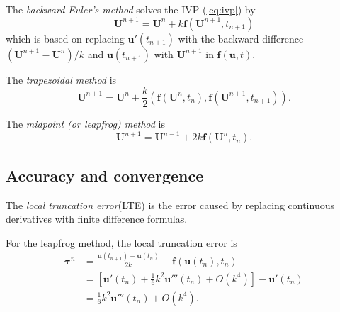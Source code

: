 \begin{defn}
 The \emph{backward Euler's method} solves the IVP (\ref{eq:ivp})
  by
  \begin{equation}
    \mathbf{U}^{n+1} = \mathbf{U}^n+k\mathbf{f}(\mathbf{U}^{n+1},t_{n+1})
  \end{equation}
  which is based on replacing $\mathbf{u}'(t_{n+1})$ with the backward
  difference $(\mathbf{U}^{n+1}-\mathbf{U}^n)/k$ and
  $\mathbf{u}(t_{n+1})$
  with $\mathbf{U}^{n+1}$ in $\mathbf{f}(\mathbf{u},t)$.
\end{defn}

\begin{defn}
  The \emph{trapezoidal method} is
  \begin{equation}
    \label{eq:trapezoidal}
    \mathbf{U}^{n+1}=\mathbf{U}^n+\frac{k}{2}(\mathbf{f}(\mathbf{U}^{n},t_n),\mathbf{f}(\mathbf{U}^{n+1},t_{n+1})).
  \end{equation}
\end{defn}

\begin{defn}
  The \emph{midpoint (or leapfrog) method} is
  \begin{equation}
    \label{eq:midpoint}
    \mathbf{U}^{n+1}=\mathbf{U}^{n-1}+2k\mathbf{f}(\mathbf{U}^{n},t_n).
  \end{equation}
\end{defn}

\subsection{Accuracy and convergence}
\label{sec:accuracy-convergence}

\begin{defn}
  The \emph{local truncation error}(LTE) is the error caused by
  replacing
  continuous derivatives with finite difference formulas.
\end{defn}

\begin{exm}
  For the leapfrog method, the local truncation error is
  \begin{displaymath}
    \begin{aligned}
      \mathbf{\tau}^n&=\frac{\mathbf{u}(t_{n+1})-\mathbf{u}(t_{n})}{2k}
      -\mathbf{f}(\mathbf{u}(t_n),t_n)\\
      &= \left [ \mathbf{u}'(t_n)+\frac{1}{6}k^2\mathbf{u}'''(t_n)+
        O(k^4)\right ]-\mathbf{u}'(t_n)\\
      &=\frac{1}{6}k^2\mathbf{u}'''(t_n)+O(k^4).
    \end{aligned}
  \end{displaymath}
\end{exm}

